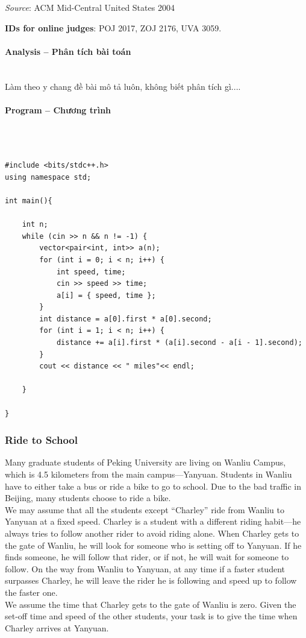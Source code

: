 \documentclass{article}
\begin{document}
\textit{Source}: ACM Mid-Central United States 2004

\textbf{IDs for online judges}: POJ 2017, ZOJ 2176, UVA 3059.


\paragraph{Analysis -- Phân tích bài toán} \mbox{} \\

Làm theo y chang đề bài mô tả luôn, không biết phân tích gì....

\paragraph{Program -- Chương trình} \mbox{} \\


\begin{lstlisting}

#include <bits/stdc++.h>
using namespace std;

int main(){
	
	int n; 
	while (cin >> n && n != -1) {
		vector<pair<int, int>> a(n);
		for (int i = 0; i < n; i++) {
			int speed, time;
			cin >> speed >> time;
			a[i] = { speed, time };
		}
		int distance = a[0].first * a[0].second;
		for (int i = 1; i < n; i++) {
			distance += a[i].first * (a[i].second - a[i - 1].second);
		}
		cout << distance << " miles"<< endl;

	}

}

\end{lstlisting}


\subsubsection{Ride to School}
Many graduate students of Peking University are living on Wanliu Campus, which is 4.5 kilometers from the main campus—Yanyuan. Students in Wanliu have to either take a bus or ride a bike to go to school. Due to the bad traffic in Beijing, many students choose to ride a bike. \\
We may assume that all the students except “Charley” ride from Wanliu to Yanyuan at a fixed speed. Charley is a student with a different riding habit—he always tries to follow another rider to avoid riding alone. When Charley gets to the gate of Wanliu, he will look for someone who
is setting off to Yanyuan. If he finds someone, he will follow that rider, or if not, he will wait for someone to follow. On the way from Wanliu to Yanyuan, at any time if a faster student surpasses Charley, he will leave the rider he is following and speed up to follow the faster one. \\
We assume the time that Charley gets to the gate of Wanliu is zero. Given the set-off time and speed of the other students, your task is to give the time when Charley arrives at Yanyuan.
\end{document}
